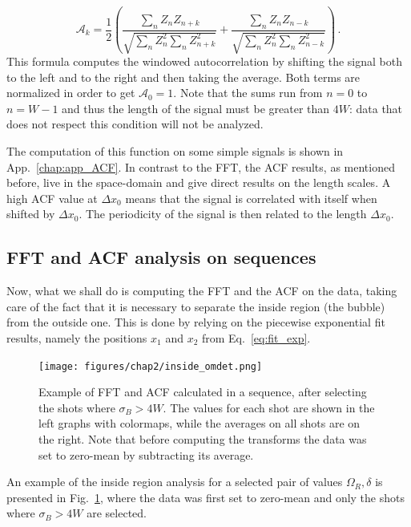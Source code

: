 \begin{equation*}
    \mathcal{A}_k = \frac{1}{2} \left( \frac{\sum_{n} Z_n Z_{n+k}}{\sqrt{\sum_{n} Z_n^2 \sum_{n} Z_{n+k}^2}} + \frac{\sum_{n} Z_n Z_{n-k}}{\sqrt{\sum_{n} Z_n^2 \sum_{n} Z_{n-k}^2}} \right)\, .
\end{equation*}
This formula computes the windowed autocorrelation by shifting the signal both to the left and to the right and then taking the average.
Both terms are normalized in order to get $\mathcal{A}_0 = 1$. 
Note that the sums run from $n = 0$ to $n = W-1$ and thus the length of the signal must be greater than $4W$: data that does not respect this condition will not be analyzed.

The computation of this function on some simple signals is shown in App.\ \ref{chap:app_ACF}. In contrast to the FFT, the ACF results, as mentioned before, live in the space-domain and give direct results on the length scales. A high ACF value at $\Delta x_0$ means that the signal is correlated with itself when shifted by $\Delta x_0$. The periodicity of the signal is then related to the length $\Delta x_0$.

\subsection{FFT and ACF analysis on sequences}
Now, what we shall do is computing the FFT and the ACF on the data, taking care of the fact that it is necessary to separate the inside region (the bubble) from the outside one. This is done by relying on the piecewise exponential fit results, namely the positions $x_1$ and $x_2$ from Eq.\ \ref{eq:fit_exp}.
\begin{figure}[h!]
    \centering
    \texttt{[image: figures/chap2/inside\_omdet.png]}
    \caption{Example of FFT and ACF calculated in a sequence, after selecting the shots where $\sigma_B > 4W$. The values for each shot are shown in the left graphs with colormaps, while the averages on all shots are on the right. Note that before computing the transforms the data was set to zero-mean by subtracting its average.}
    \label{fig:inside_00}
\end{figure}
An example of the inside region analysis for a selected pair of values $\Omega_R, \delta$ is presented in Fig.\ \ref{fig:inside_00}, where the data was first set to zero-mean and only the shots where $\sigma_B > 4W$ are selected.

